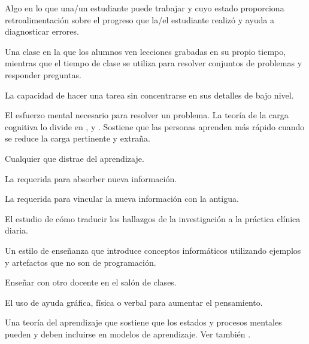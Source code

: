 \begin{description}
 Algo en lo que una/un estudiante puede trabajar 
y cuyo estado proporciona retroalimentación sobre el progreso que la/el estudiante realizó
y ayuda a diagnosticar errores.

 Una clase en la que los alumnos 
ven lecciones grabadas en su propio tiempo, mientras que el tiempo de clase 
se utiliza para resolver conjuntos de problemas y responder preguntas.

 La capacidad de hacer una tarea sin 
concentrarse en sus detalles de bajo nivel.

 El esfuerzo mental necesario para resolver un problema.
La teoría de la carga cognitiva lo divide en
 ,
y .
Sostiene que las personas aprenden más rápido cuando se reduce la carga pertinente y extraña.

 Cualquier 
que distrae del aprendizaje.

 La 
requerida para absorber nueva información.

 La 
requerida para vincular la nueva información con la antigua.

 El estudio de cómo traducir 
los hallazgos de la investigación a la práctica clínica diaria.

 Un estilo de enseñanza que introduce 
conceptos informáticos utilizando ejemplos y artefactos que no son de programación.

 Enseñar con otro docente en el
salón de clases.

 El uso de ayuda gráfica, 
física o verbal para aumentar el pensamiento.

 Una teoría del aprendizaje que sostiene que los estados 
y procesos mentales pueden y deben incluirse en modelos de aprendizaje. Ver también
.


\end{description}
